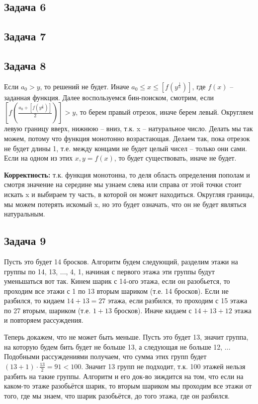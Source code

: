\documentclass[a4paper,14pt]{article} %
\begin{document}
\subsection{Задача 6}

\subsection{Задача 7}

\subsection{Задача 8}
Если $a_0 > y$, то решений не будет.
Иначе $a_0 \leq x \leq [f(y^{\frac{1}{n}})]$, где $f(x)$ -- заданная функция.
Далее воспользуемся бин-поиском, смотрим, если $[f(\frac{a_0 + [f(y^{\frac{1}{n}})]}{2})] > y$, то берем правый отрезок, иначе берем левый.
Округляем левую границу вверх, нижнюю -- вниз, т.к. x -- натуральное число. Делать мы так можем, потому что функция монотонно возрастающая. 
Делаем так, пока отрезок не будет длины 1, т.е. между концами не будет целый чисел -- только они сами. Если на одном из этих $x, y = f(x)$, то будет существовать, иначе не будет.

\textbf{Корректность:} т.к. функция монотонна, то деля область определения пополам и смотря значение на середине мы узнаем слева или справа от этой точки стоит искать x и выбираем ту часть, 
в которой он может находиться. Округляя границы, мы можем потерять искомый x, но это будет означать, что он не будет являться натуральным. 

\subsection{Задача 9}
Пусть это будет 14 бросков. 
Алгоритм будем следующий, разделим этажи на группы по 14, 13, ..., 4, 1, начиная с первого этажа эти группы будут уменьшаться вот так.
Кинем шарик с 14-ого этажа, если он разобьется, то проходим все этажи с 1 по 13 вторым шариком (т.е. 14 бросков). Если не разбился, то кидаем $14 + 13 = 27$ этажа, 
если разбился, то проходим с 15 этажа по 27 вторым, шариком (т.е. $1 + 13$ бросков). Иначе кидаем с $14+13+12$ этажа и повторяем рассуждения.

Теперь докажем, что не может быть меньше. Пусть это будет 13, значит группа, на которую будем бить будет не больше 13, а следующая не больше 12, ...
Подобными рассуждениями получаем, что сумма этих групп будет $(13 + 1) \cdot \frac{13}{2} = 91 < 100$.
Значит 13 групп не подходит, т.к. 100 этажей нельзя разбить на такие группы. 
Алгоритм и его док-во зиждится на том, что если на каком-то этаже разобьётся шарик, то вторым шариком мы проходим все этажи от того, где мы знаем, что шарик разобьётся, до того этажа, где он разбился.
\end{document}
